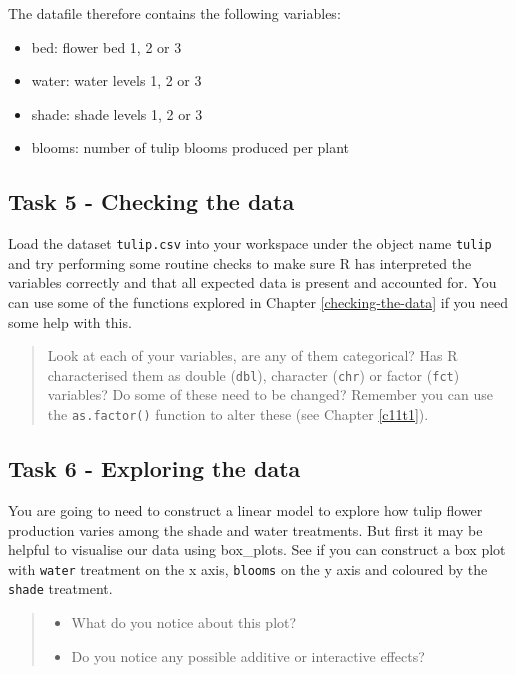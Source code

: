 \documentclass[
]{book}
\providecommand{\tightlist}{%
  \setlength{\itemsep}{0pt}\setlength{\parskip}{0pt}}
\begin{document}
The datafile therefore contains the following variables:

\begin{itemize}
\tightlist
\item
  bed: flower bed 1, 2 or 3
\item
  water: water levels 1, 2 or 3
\item
  shade: shade levels 1, 2 or 3
\item
  blooms: number of tulip blooms produced per plant
\end{itemize}

\hypertarget{task-5---checking-the-data}{%
\subsection{Task 5 - Checking the data}\label{task-5---checking-the-data}}

Load the dataset \texttt{tulip.csv} into your workspace under the object name \texttt{tulip} and try performing some routine checks to make sure R has interpreted the variables correctly and that all expected data is present and accounted for. You can use some of the functions explored in Chapter \ref{checking-the-data} if you need some help with this.

\begin{quote}
Look at each of your variables, are any of them categorical? Has R characterised them as double (\texttt{dbl}), character (\texttt{chr}) or factor (\texttt{fct}) variables?
Do some of these need to be changed? Remember you can use the \texttt{as.factor()} function to alter these (see Chapter \ref{c11t1}).
\end{quote}

\hypertarget{task-6---exploring-the-data}{%
\subsection{Task 6 - Exploring the data}\label{task-6---exploring-the-data}}

You are going to need to construct a linear model to explore how tulip flower production varies among the shade and water treatments. But first it may be helpful to visualise our data using box\_plots. See if you can construct a box plot with \texttt{water} treatment on the x axis, \texttt{blooms} on the y axis and coloured by the \texttt{shade} treatment.

\begin{quote}
\begin{itemize}
\tightlist
\item
  What do you notice about this plot?
\item
  Do you notice any possible additive or interactive effects?
\end{itemize}
\end{quote}
\end{document}

